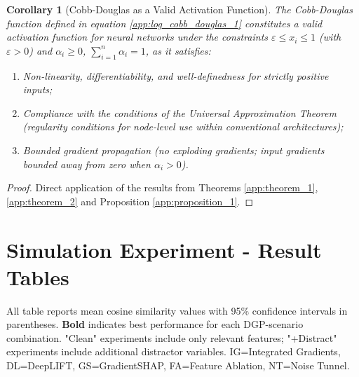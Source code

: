 \documentclass[preprint,12pt,authoryear]{sn-jnl}
\newtheorem{corollary}{Corollary}
\begin{document}
\setcounter{corollary}{0}
\begin{corollary}[Cobb-Douglas as a Valid Activation Function] \label{app:corollary}
The Cobb-Douglas function defined in equation \ref{app:log_cobb_douglas_1} constitutes a valid activation function for neural networks under the constraints $\varepsilon \leq x_i \leq 1$ (with $\varepsilon > 0$) and $\alpha_i \geq 0$, $\sum_{i=1}^n \alpha_i = 1$, as it satisfies:
\begin{enumerate}
    \item Non-linearity, differentiability, and well-definedness for strictly positive inputs;
    \item Compliance with the conditions of the Universal Approximation Theorem (regularity conditions for node-level use within conventional architectures);
    \item Bounded gradient propagation (no exploding gradients; input gradients bounded away from zero when $\alpha_i > 0$).
\end{enumerate}
\end{corollary}

\begin{proof}
Direct application of the results from Theorems \ref{app:theorem_1}, \ref{app:theorem_2} and Proposition \ref{app:proposition_1}.
\end{proof}

\section{Simulation Experiment - Result Tables} \label{appendix:simulation_results_tables}

All table reports mean cosine similarity values with 95\% confidence intervals in parentheses. \textbf{Bold} indicates best performance for each DGP-scenario combination. "Clean" experiments include only relevant features; "+Distract" experiments include additional distractor variables. IG=Integrated Gradients, DL=DeepLIFT, GS=GradientSHAP, FA=Feature Ablation, NT=Noise Tunnel. 
\end{document}
